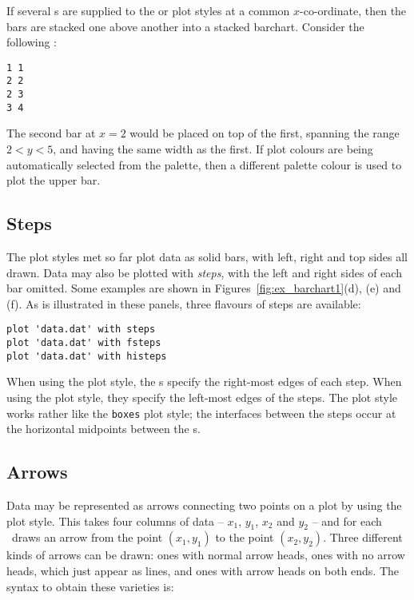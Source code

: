 If several \datapoint s are supplied to the  or 
plot styles at a common $x$-co-ordinate, then the bars are stacked one above
another into a stacked barchart. Consider the following \datafile:

\begin{verbatim}
1 1
2 2
2 3
3 4
\end{verbatim}

\noindent The second bar at $x=2$ would be placed on top of the first, spanning
the range $2<y<5$, and having the same width as the first. If plot colours are
being automatically selected from the palette, then a different palette colour
is used to plot the upper bar.

\subsection{Steps}

The plot styles met so far plot data as solid bars, with left, right and top
sides all drawn. Data may also be plotted with {\it steps}, with the left and
right sides of each bar omitted. Some examples are shown in
Figures~\ref{fig:ex_barchart1}(d), (e) and (f).  As is illustrated in these
panels, three flavours of steps are available:

\begin{verbatim}
plot 'data.dat' with steps
plot 'data.dat' with fsteps
plot 'data.dat' with histeps
\end{verbatim}

\noindent When using the  plot style, the \datapoint s specify the
right-most edges of each step. When using the  plot style, they
specify the left-most edges of the steps. The  plot style works
rather like the {\tt boxes} plot style; the interfaces between the steps occur
at the horizontal midpoints between the \datapoint s.

\subsection{Arrows}

Data may be represented as arrows connecting two points on a plot by using the
 plot style.  This takes four columns of data -- $x_1$, $y_1$,
$x_2$ and $y_2$ -- and for each \datapoint\ draws an arrow from the point
$(x_1,y_1)$ to the point $(x_2,y_2)$.  Three different kinds of arrows can be
drawn: ones with normal arrow heads, ones with no arrow heads, which just
appear as lines, and ones with arrow heads on both ends. The syntax to obtain
these varieties is:

